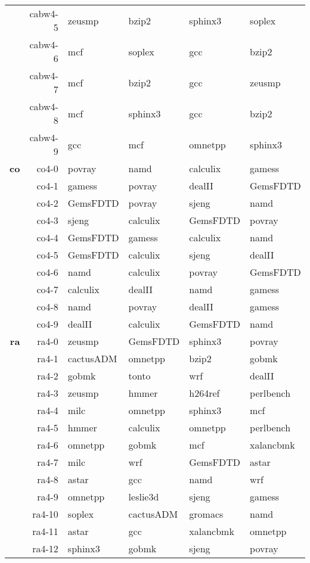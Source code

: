 \begin{table}[ht]
{\begin{tabular}{|r|r|llll|}
			 & cabw4-5	 & zeusmp & bzip2 & sphinx3 & soplex \\ 
			 & cabw4-6	 & mcf & soplex & gcc & bzip2 \\ 
			 & cabw4-7	 & mcf & bzip2 & gcc & zeusmp \\ 
			 & cabw4-8	 & mcf & sphinx3 & gcc & bzip2 \\ 
			 & cabw4-9	 & gcc & mcf & omnetpp & sphinx3 \\ 
\textbf{co}	 & co4-0	 & povray & namd & calculix & gamess \\ 
			 & co4-1	 & gamess & povray & dealII & GemsFDTD \\ 
			 & co4-2	 & GemsFDTD & povray & sjeng & namd \\ 
			 & co4-3	 & sjeng & calculix & GemsFDTD & povray \\ 
			 & co4-4	 & GemsFDTD & gamess & calculix & namd \\ 
			 & co4-5	 & GemsFDTD & calculix & sjeng & dealII \\ 
			 & co4-6	 & namd & calculix & povray & GemsFDTD \\ 
			 & co4-7	 & calculix & dealII & namd & gamess \\ 
			 & co4-8	 & namd & povray & dealII & gamess \\ 
			 & co4-9	 & dealII & calculix & GemsFDTD & namd \\ 
\textbf{ra}	 & ra4-0	 & zeusmp & GemsFDTD & sphinx3 & povray \\ 
			 & ra4-1	 & cactusADM & omnetpp & bzip2 & gobmk \\ 
			 & ra4-2	 & gobmk & tonto & wrf & dealII \\ 
			 & ra4-3	 & zeusmp & hmmer & h264ref & perlbench \\ 
			 & ra4-4	 & milc & omnetpp & sphinx3 & mcf \\ 
			 & ra4-5	 & hmmer & calculix & omnetpp & perlbench \\ 
			 & ra4-6	 & omnetpp & gobmk & mcf & xalancbmk \\ 
			 & ra4-7	 & milc & wrf & GemsFDTD & astar \\ 
			 & ra4-8	 & astar & gcc & namd & wrf \\ 
			 & ra4-9	 & omnetpp & leslie3d & sjeng & gamess \\ 
			 & ra4-10	 & soplex & cactusADM & gromacs & namd \\ 
			 & ra4-11	 & astar & gcc & xalancbmk & omnetpp \\ 
			 & ra4-12	 & sphinx3 & gobmk & sjeng & povray \\ 

\end{tabular}}
\end{table}
